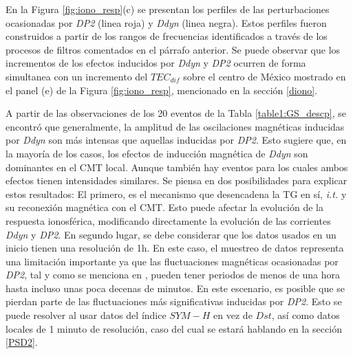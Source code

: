 En la Figura \ref{fig:iono_resp}(c) se presentan los perfiles de las perturbaciones ocasionadas por \emph{DP2} (linea roja) y \emph{Ddyn} (linea negra). Estos perfiles fueron construidos a partir de los rangos de frecuencias identificados a través de los procesos de filtros comentados en el párrafo anterior. Se puede observar que los incrementos de los efectos inducidos por \emph{Ddyn} y \emph{DP2} ocurren de forma simultanea con un incremento del $TEC_{dif}$ sobre el centro de México mostrado en el panel (e) de la Figura \ref{fig:iono_resp}, mencionado en la sección \ref{diono}. 
\vspace{1 em}


A partir de las observaciones de los 20 eventos de la Tabla \ref{table1:GS_descp}, se encontró que generalmente, la amplitud de las oscilaciones magnéticas inducidas por \emph{Ddyn} son más intensas que aquellas inducidas por \emph{DP2}. Esto sugiere que, en la mayoría de los casos, los efectos de inducción magnética de \emph{Ddyn} son dominantes en el CMT local. Aunque también hay eventos para los cuales ambos efectos tienen intensidades similares. Se piensa en dos posibilidades para explicar estos resultados: El primero, es el mecanismo que desencadena la TG en sí, \emph{i.t.} y su reconexión magnética con el CMT. Esto puede afectar la evolución de la respuesta ionosférica, modificando directamente la evolución de las corrientes \emph{Ddyn} y \emph{DP2}. En segundo lugar, se debe considerar que los datos usados en un inicio tienen una resolución de 1h. En este caso, el muestreo de datos representa una limitación importante ya que las fluctuaciones magnéticas ocasionadas por \emph{DP2}, tal y como se menciona en \cite{nishida_68_fluctuations}, pueden tener periodos de menos de una hora hasta incluso unas poca decenas de minutos. En este escenario, es posible que se pierdan parte de las fluctuaciones más significativas inducidas por \emph{DP2}. Esto se puede resolver al usar datos del índice $SYM-H$ en vez de $Dst$, así como datos locales de 1 minuto de resolución, caso del cual se estará hablando en la sección \ref{PSD2}. 
\vspace{1 em}

